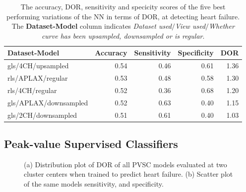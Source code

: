 \begin{table}
    \centering
    \begin{tabular}{lrrrr}
        \toprule
        Dataset-Model         &  Accuracy &  Sensitivity &  Specificity &  DOR \\
        \midrule
        gls/4CH/upsampled     &      0.54 &         0.46 &         0.61 & 1.36 \\
        rls/APLAX/regular     &      0.53 &         0.48 &         0.58 & 1.30 \\
        rls/4CH/regular       &      0.52 &         0.36 &         0.68 & 1.20 \\
        gls/APLAX/downsampled &      0.52 &         0.63 &         0.40 & 1.15 \\
        gls/2CH/downsampled   &      0.51 &         0.61 &         0.40 & 1.03 \\
        \bottomrule
    \end{tabular}
    \caption{The accuracy, DOR, sensitivity and specicity scores of the five best performing variations of the NN in terms of DOR, at detecting heart failure.
             The \textbf{Dataset-Model} column indicates \textit{Dataset used}$/$\textit{View used}$/$\textit{Whether curve has been upsampled, downsampled or is regular}.}
    \label{tab:dl_hf_dor_sens_spec_dist}
\end{table}
\newpage

\subsection{Peak-value Supervised Classifiers}

\begin{figure}[htb]
    \centering
    
    \caption{(a) Distribution plot of DOR of all PVSC models evaluated at two cluster centers when trained to predict heart failure.
             (b) Scatter plot of the same models sensitivity, and specificity.}
    \label{fig:pvmlc_hf_dor_sens_spec_dis}
\end{figure}

